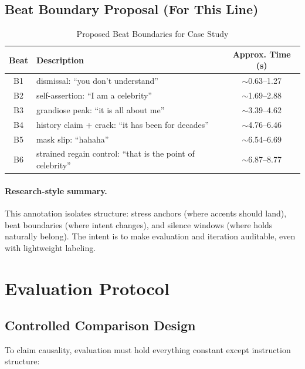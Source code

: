 \documentclass[11pt,a4paper]{article}
\begin{document}
\subsection{Beat Boundary Proposal (For This Line)}

\begin{table}[H]
\centering
\caption{Proposed Beat Boundaries for Case Study}
\label{tab:beat-boundaries}
\begin{tabular}{@{}clc@{}}
\toprule
\textbf{Beat} & \textbf{Description} & \textbf{Approx. Time (s)} \\
\midrule
B1 & dismissal: ``you don't understand'' & $\sim$0.63--1.27 \\
B2 & self-assertion: ``I am a celebrity'' & $\sim$1.69--2.88 \\
B3 & grandiose peak: ``it is all about me'' & $\sim$3.39--4.62 \\
B4 & history claim + crack: ``it has been for decades'' & $\sim$4.76--6.46 \\
B5 & mask slip: ``hahaha'' & $\sim$6.54--6.69 \\
B6 & strained regain control: ``that is the point of celebrity'' & $\sim$6.87--8.77 \\
\bottomrule
\end{tabular}
\end{table}

\paragraph{Research-style summary.} This annotation isolates structure: stress anchors (where accents should land), beat boundaries (where intent changes), and silence windows (where holds naturally belong). The intent is to make evaluation and iteration auditable, even with lightweight labeling.

\section{Evaluation Protocol}

\subsection{Controlled Comparison Design}

To claim causality, evaluation must hold everything constant except instruction structure:
\end{document}
